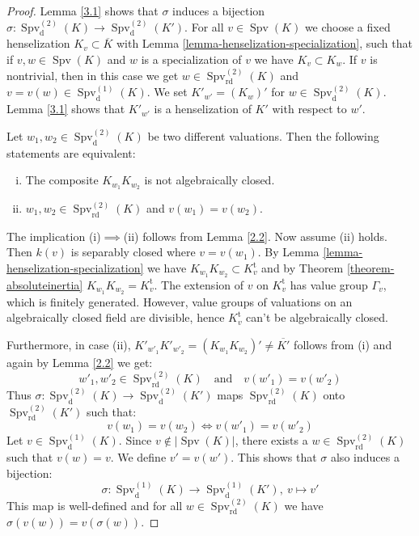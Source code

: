\begin{proof}
Lemma \ref{3.1} shows that $\sigma$ induces a bijection $\sigma: \operatorname{Spv}_\text{d}^{(2)}(K)\to \operatorname{Spv}_\text{d}^{(2)}(K')$. For all $v\in\operatorname{Spv}(K)$ we choose a fixed henselization $K_v\subset\overline{K}$ with Lemma \ref{lemma-henselization-specialization}, such that if $v,w\in\operatorname{Spv}(K)$ and $w$ is a specialization of $v$ we have $K_v\subset K_w$. If $v$ is nontrivial, then in this case we get $w\in\operatorname{Spv}_\text{rd}^{(2)}(K)$ and $v=v(w)\in\operatorname{Spv}_\text{d}^{(1)}(K)$. We set $K'_{w'} = (K_w)'$ for $w\in\operatorname{Spv}_\text{d}^{(2)}(K)$. Lemma \ref{3.1} shows that $K'_{w'}$ is a henselization of $K'$ with respect to $w'$.

Let $w_1,w_2 \in\operatorname{Spv}_\text{d}^{(2)}(K)$ be two different valuations. Then the following statements are equivalent:
\begin{enumerate}[(i)]
\item The composite $K_{w_1}K_{w_2}$ is not algebraically closed.
\item $w_1,w_2\in\operatorname{Spv}_\text{rd}^{(2)}(K)$ and $v(w_1) = v(w_2)$.
\end{enumerate}
The implication (i)$\implies$(ii) follows from Lemma \ref{2.2}. Now assume (ii) holds. Then $k(v)$ is separably closed where $v=v(w_1)$. By Lemma \ref{lemma-henselization-specialization} we have $K_{w_1}K_{w_2}\subset K_v^\text{t}$ and by Theorem \ref{theorem-absoluteinertia} $K_{w_1}K_{w_2}=K_v^\text{t}$. The extension of $v$ on $K_v^\text{t}$ has value group $\Gamma_v$, which is finitely generated. However, value groups of valuations on an algebraically closed field are divisible, hence $K_v^\text{t}$ can't be algebraically closed.

Furthermore, in case (ii), $K'_{w'_1}K'_{w'_2} = (K_{w_1}K_{w_2})' \neq \overline{K'}$ follows from (i) and again by Lemma \ref{2.2} we get: \[w'_1,w'_2\in\operatorname{Spv}_\text{rd}^{(2)}(K)\quad \text{and} \quad v(w'_1) = v(w'_2)\]
Thus $\sigma: \operatorname{Spv}_\text{d}^{(2)}(K)\to \operatorname{Spv}_\text{d}^{(2)}(K')$ maps $\operatorname{Spv}_\text{rd}^{(2)}(K)$ onto $\operatorname{Spv}_\text{rd}^{(2)}(K')$ such that:
\[ v(w_1)=v(w_2) \iff v(w'_1) = v(w'_2) \]
Let $v\in\operatorname{Spv}_\text{d}^{(1)}(K)$. Since $v\not\in |\operatorname{Spv}(K)|$, there exists a $w\in\operatorname{Spv}_\text{rd}^{(2)}(K)$ such that $v(w)=v$. We define $v'=v(w')$. This shows that $\sigma$ also induces a bijection: 
\[\sigma:\operatorname{Spv}_\text{d}^{(1)}(K)\to\operatorname{Spv}_\text{d}^{(1)}(K'),\ v\mapsto v'\] 
This map is well-defined and for all $w\in\operatorname{Spv}_\text{rd}^{(2)}(K)$ we have $\sigma(v(w)) = v(\sigma(w))$.


\end{proof}
